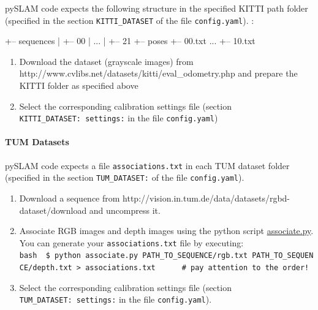 \documentclass{article}
\newenvironment{Shaded}{\begin{snugshade}}{\end{snugshade}}
\newcommand{\NormalTok}[1]{\textcolor[rgb]{0.74,0.68,0.62}{#1}}
\providecommand{\tightlist}{%
  \setlength{\itemsep}{0pt}\setlength{\parskip}{0pt}}
\let\oldparagraph\paragraph
\renewcommand{\paragraph}[1]{\oldparagraph{#1}\mbox{}}
\begin{document}
pySLAM code expects the following structure in the specified KITTI path
folder (specified in the section \texttt{KITTI\_DATASET} of the file
\texttt{config.yaml}). :

\begin{scriptsize}
\begin{Shaded}
\begin{Highlighting}[]
\NormalTok{+-- sequences}
\NormalTok{|   +-- 00}
\NormalTok{|   ...}
\NormalTok{|   +-- 21}
\NormalTok{+-- poses}
\NormalTok{    +-- 00.txt}
\NormalTok{    ...}
\NormalTok{    +-- 10.txt}
\end{Highlighting}
\end{Shaded}
\end{scriptsize}

\begin{enumerate}
\def\labelenumi{\arabic{enumi}.}
\item
  Download the dataset (grayscale images) from
  http://www.cvlibs.net/datasets/kitti/eval\_odometry.php and prepare
  the KITTI folder as specified above
\item
  Select the corresponding calibration settings file (section
  \texttt{KITTI\_DATASET:\ settings:} in the file \texttt{config.yaml})
\end{enumerate}

\hypertarget{tum-datasets}{%
\paragraph{TUM Datasets}\label{tum-datasets}}

pySLAM code expects a file \texttt{associations.txt} in each TUM dataset
folder (specified in the section \texttt{TUM\_DATASET:} of the file
\texttt{config.yaml}).

\begin{enumerate}
\def\labelenumi{\arabic{enumi}.}
\tightlist
\item
  Download a sequence from
  http://vision.in.tum.de/data/datasets/rgbd-dataset/download and
  uncompress it.
\item
  Associate RGB images and depth images using the python script
  \href{http://vision.in.tum.de/data/datasets/rgbd-dataset/tools}{associate.py}.
  You can generate your \texttt{associations.txt} file by executing:
  \texttt{bash\ \ \$\ python\ associate.py\ PATH\_TO\_SEQUENCE/rgb.txt\ PATH\_TO\_SEQUENCE/depth.txt\ \textgreater{}\ associations.txt\ \ \ \ \ \ \#\ pay\ attention\ to\ the\ order!}
\item
  Select the corresponding calibration settings file (section
  \texttt{TUM\_DATASET:\ settings:} in the file \texttt{config.yaml}).
\end{enumerate}
\end{document}
